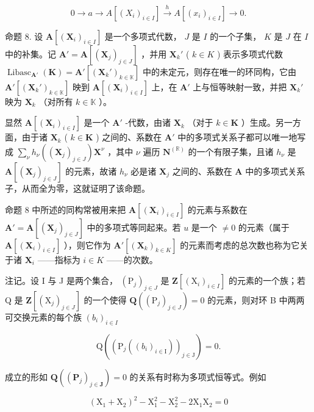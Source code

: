 \[
0 \longrightarrow a \longrightarrow A [ (X _ {i}) _ {i \in I} ] \stackrel {h} {\longrightarrow} A [ (x _ {i}) _ {i \in I} ] \longrightarrow 0.
\]

命题 8. 设 \(\mathbf{A}[(\mathbf{X}_i)_{i\in I}]\) 是一个多项式代数， \(J\) 是 \(I\) 的一个子集， \(K\) 是 \(J\) 在 \(I\) 中的补集。记 \(\mathbf{A}' = \mathbf{A}[(\mathbf{X}_j)_{j\in J}]\) ，并用 \(\mathbf{X}_k'\) ( \(k\in K\) ) 表示多项式代数 \(\operatorname{Libasc}_{\mathbf{A}'}(\mathbf{K}) = \mathbf{A}'[(\mathbf{X}_k')_{k \in \mathbb{K}}]\) 中的未定元，则存在唯一的环同构，它由 \(\mathbf{A}'[(\mathbf{X}_k')_{k \in \mathbb{K}}]\) 映到 \(\mathbf{A}[(\mathbf{X}_i)_{i \in I}]\) 上，在 \(\mathbf{A}'\) 上与恒等映射一致，并把 \(\mathbf{X}_k'\) 映为 \(\mathbf{X}_k\) （对所有 \(k \in \mathbb{K}\) ）。

显然 \(\mathbf{A}[(\mathbf{X}_i)_{i\in I}]\) 是一个 \(\mathbf{A}'\) -代数，由诸 \(\mathbf{X}_k\) （对于 \(k\in \mathbf{K}\) ）生成。另一方面，由于诸 \(\mathbf{X}_k\) ( \(k\in \mathbf{K}\) ) 之间的、系数在 \(\mathbf{A}'\) 中的多项式关系子都可以唯一地写成 \(\sum_{\nu}h_{\nu}((\mathbf{X}_j)_{j\in J})\mathbf{X}^{\nu}\) ，其中 \(\nu\) 遍历 \(\mathbf{N}^{(\mathbb{R})}\) 的一个有限子集，且诸 \(h_\nu\) 是 \(\mathbf{A}[(\mathbf{X}_j)_{j\in J}]\) 的元素，故诸 \(h_\nu\) 必是诸 \(\mathbf{X}_j\) 之间的、系数在 \(\mathbf{A}\) 中的多项式关系子，从而全为零，这就证明了该命题。

命题 8 中所述的同构常被用来把 \(\mathbf{A}[(\mathbf{X}_i)_{i\in I}]\) 的元素与系数在 \(\mathbf{A}' = \mathbf{A}[(\mathbf{X}_j)_{j\in J}]\) 中的多项式等同起来。若 \(u\) 是一个 \(\neq 0\) 的元素（属于 \(\mathbf{A}[(\mathbf{X}_i)_{i\in I}]\) ），则它作为 \(\mathbf{A}'[(\mathbf{X}_k)_{k\in K}]\) 的元素而考虑的总次数也称为它关于诸 \(\mathbf{X}_i\) ——指标为 \(i\in K\) ——的次数。

注记。设 I 与 J 是两个集合， \((\mathrm{P}_{j})_{j\in J}\) 是 \(\mathbf{Z}[(\mathrm{X}_{i})_{i\in I}]\) 的元素的一个族；若 Q 是 \(\mathbf{Z}[(\mathrm{X}_{j})_{j\in J}]\) 的一个使得 \(\mathbf{Q}((\mathrm{P}_{j})_{j\in J})=0\) 的元素，则对环 B 中两两可交换元素的每个族 \((b_{i})_{i\in I}\)

\[
\mathrm{Q} ((\mathrm{P} _ {j} ((b _ {i}) _ {i \in \mathrm{I}})) _ {j \in \mathrm{J}}) = 0.
\]

成立的形如 \(\mathbf{Q}((\mathbf{P}_{j})_{j\in\mathbf{J}})=0\) 的关系有时称为多项式恒等式。例如

\[
\left(\mathrm{X} _ {1} + \mathrm{X} _ {2}\right) ^ {2} - \mathrm{X} _ {1} ^ {2} - \mathrm{X} _ {2} ^ {2} - 2 \mathrm{X} _ {1} \mathrm{X} _ {2} = 0
\]

